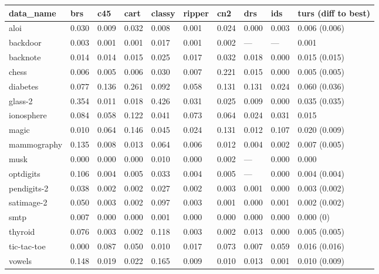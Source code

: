 \begin{table}[ht]
\small
\centering
\begin{tabular}{l|llllllll|l}
  \hline
data\_name & brs & c45 & cart & classy & ripper & cn2 & drs & ids & turs \tiny{(diff to best)} \\ 
  \hline
aloi & 0.030 & 0.009 & 0.032 & 0.008 & 0.001 & 0.024 & 0.000 & 0.003 & 0.006 \tiny{(0.006)} \\ 
  backdoor & 0.003 & 0.001 & 0.001 & 0.017 & 0.001 & 0.002 & --- & --- & 0.001 \\ 
  backnote & 0.014 & 0.014 & 0.015 & 0.025 & 0.017 & 0.032 & 0.018 & 0.000 & 0.015 \tiny{(0.015)} \\ 
  chess & 0.006 & 0.005 & 0.006 & 0.030 & 0.007 & 0.221 & 0.015 & 0.000 & 0.005 \tiny{(0.005)} \\ 
  diabetes & 0.077 & 0.136 & 0.261 & 0.092 & 0.058 & 0.131 & 0.131 & 0.024 & 0.060 \tiny{(0.036)} \\ 
  glass-2 & 0.354 & 0.011 & 0.018 & 0.426 & 0.031 & 0.025 & 0.009 & 0.000 & 0.035 \tiny{(0.035)} \\ 
  ionosphere & 0.084 & 0.058 & 0.122 & 0.041 & 0.073 & 0.064 & 0.024 & 0.031 & 0.015 \\ 
  magic & 0.010 & 0.064 & 0.146 & 0.045 & 0.024 & 0.131 & 0.012 & 0.107 & 0.020 \tiny{(0.009)} \\ 
  mammography & 0.135 & 0.008 & 0.013 & 0.064 & 0.006 & 0.012 & 0.004 & 0.002 & 0.007 \tiny{(0.005)} \\ 
  musk & 0.000 & 0.000 & 0.000 & 0.010 & 0.000 & 0.002 & --- & 0.000 & 0.000 \\ 
  optdigits & 0.106 & 0.004 & 0.005 & 0.033 & 0.004 & 0.005 & --- & 0.000 & 0.004 \tiny{(0.004)} \\ 
  pendigits-2 & 0.038 & 0.002 & 0.002 & 0.027 & 0.002 & 0.003 & 0.001 & 0.000 & 0.003 \tiny{(0.002)} \\ 
  satimage-2 & 0.050 & 0.003 & 0.002 & 0.097 & 0.003 & 0.001 & 0.000 & 0.001 & 0.002 \tiny{(0.002)} \\ 
  smtp & 0.007 & 0.000 & 0.000 & 0.001 & 0.000 & 0.000 & 0.000 & 0.000 & 0.000 \tiny{(0)} \\ 
  thyroid & 0.076 & 0.003 & 0.002 & 0.118 & 0.003 & 0.002 & 0.013 & 0.000 & 0.005 \tiny{(0.005)} \\ 
  tic-tac-toe & 0.000 & 0.087 & 0.050 & 0.010 & 0.017 & 0.073 & 0.007 & 0.059 & 0.016 \tiny{(0.016)} \\ 
  vowels & 0.148 & 0.019 & 0.022 & 0.165 & 0.009 & 0.010 & 0.013 & 0.001 & 0.010 \tiny{(0.009)} \\ 

\end{tabular}
\end{table}
